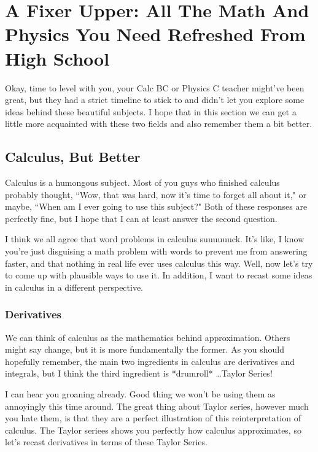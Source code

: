 \documentclass[11pt]{scrartcl}
\begin{document}
\section{A Fixer Upper: All The Math And Physics You Need Refreshed From High School}

Okay, time to level with you, your Calc BC or Physics C teacher might've been great, but they had a strict timeline to stick to and didn't let you explore some ideas behind these beautiful subjects. I hope that in this section we can get a little more acquainted with these two fields and also remember them a bit better. 

\subsection{Calculus, But Better}

Calculus is a humongous subject. Most of you guys who finished calculus probably thought, ``Wow, that was hard, now it's time to forget all about it," or maybe, ``When am I ever going to use this subject?" Both of these responses are perfectly fine, but I hope that I can at least answer the second question. 

	I think we all agree that word problems in calculus suuuuuuck. It's like, I know you're just disguising a math problem with words to prevent me from answering faster, and that nothing in real life ever uses calculus this way. Well, now let's try to come up with plausible ways to use it. In addition, I want to recast some ideas in calculus in a different perspective.

\subsubsection{Derivatives}

We can think of calculus as the mathematics behind approximation. Others might say change, but it is more fundamentally the former. As you should hopefully remember, the main two ingredients in calculus are derivatives and integrals, but I think the third ingredient is *drumroll* \ldots Taylor Series!

	I can hear you groaning already. Good thing we won't be using them as annoyingly this time around. The great thing about Taylor series, however much you hate them, is that they are a perfect illustration of this reinterpretation of calculus. The Taylor seriees shows you perfectly how calculus approximates, so let's recast derivatives in terms of these Taylor Series.
\end{document}

